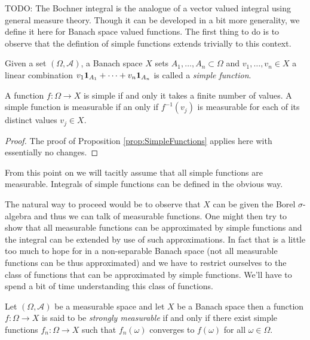 TODO:
The Bochner integral is the analogue of a vector valued integral using
general measure theory.  Though it can be developed in a bit more
generality, we define it here for Banach space valued functions.  
The first thing to do is to observe that the defintion of simple functions
extends trivially to this context.
\begin{defn}Given a set $(\Omega, \mathcal{A})$, a Banach space $X$
  sets $A_1, \dotsc, A_n \subset \Omega$ and $v_1, \dotsc, v_n \in X$ a
  linear combination $v_1
  \textbf{1}_{A_1} + \cdots + v_n \textbf{1}_{A_n}$ is called
  a \emph{simple function}.
\end{defn}

\begin{prop}\label{prop:SimpleVectorValuedFunctions}A function $f : \Omega \to X$ is simple if and only it
  takes a finite number of values.  A simple function is measurable if
  an only if $f^{-1}(v_j)$ is measurable for each of its distinct
  values $v_j \in X$.
\end{prop}
\begin{proof}
The proof of Proposition \ref{prop:SimpleFunctions} applies here with essentially
no changes.
\end{proof}

From this point on we will tacitly assume that all simple functions
are measurable. Integrals of simple functions can be defined in the obvious way.

The natural way to proceed would be to observe that $X$ can be given
the Borel $\sigma$-algebra and thus we can talk of measurable
functions.  One might then try to show that all measurable functions
can be approximated by simple functions and the integral can be
extended by use of such approximations.  In fact that is a little too much to hope for in a
non-separable Banach space (not all measurable functions can be thus
approximated) 
and we have to restrict ourselves to the class of functions that can be approximated
by simple functions.  We'll have to spend a bit of time understanding
this class of functions. 

\begin{defn}Let $(\Omega,\mathcal{A})$ be a measurable space and let
  $X$ be a Banach space then a function $f : \Omega \to X$ is said to
  be \emph{strongly measurable} if and only if there exist simple
  functions $f_n : \Omega \to X$ such that $f_n(\omega)$ converges to 
$f(\omega)$ for  all $\omega \in \Omega$.
\end{defn}

